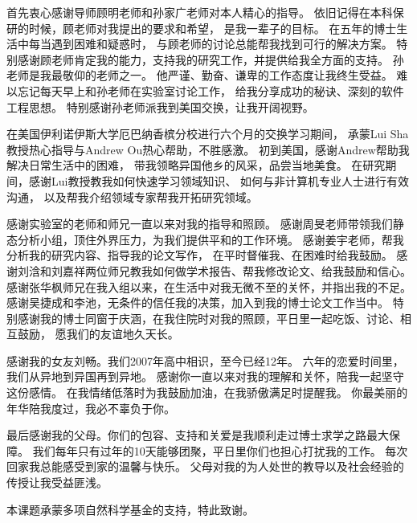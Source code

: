 \begin{acknowledgement}
  首先衷心感谢导师顾明老师和孙家广老师对本人精心的指导。
  依旧记得在本科保研的时候，顾老师对我提出的要求和希望，
  是我一辈子的目标。
  在五年的博士生活中每当遇到困难和疑惑时，
  与顾老师的讨论总能帮我找到可行的解决方案。
  特别感谢顾老师肯定我的能力，支持我的研究工作，并提供给我全方面的支持。
  孙老师是我最敬仰的老师之一。
  他严谨、勤奋、谦卑的工作态度让我终生受益。
  难以忘记每天早上和孙老师在实验室讨论工作，
  给我分享成功的秘诀、深刻的软件工程思想。
  特别感谢孙老师派我到美国交换，让我开阔视野。

  
  在美国伊利诺伊斯大学厄巴纳香槟分校进行六个月的交换学习期间，
  承蒙Lui Sha教授热心指导与Andrew Ou热心帮助，不胜感激。
  初到美国，感谢Andrew帮助我解决日常生活中的困难，
  带我领略异国他乡的风采，品尝当地美食。
  在研究期间，感谢Lui教授教我如何快速学习领域知识、
  如何与非计算机专业人士进行有效沟通，
  以及帮我介绍领域专家帮我开拓研究领域。
  

  感谢实验室的老师和师兄一直以来对我的指导和照顾。
  感谢周旻老师带领我们静态分析小组，顶住外界压力，为我们提供平和的工作环境。
  感谢姜宇老师，帮我分析我的研究内容、指导我的论文写作，
  在平时督催我、在困难时给我鼓励。
  感谢刘浛和刘嘉祥两位师兄教我如何做学术报告、帮我修改论文、给我鼓励和信心。
  感谢张华枫师兄在我入组以来，在生活中对我无微不至的关怀，并指出我的不足。  
  感谢吴捷成和李池，无条件的信任我的决策，加入到我的博士论文工作当中。
  特别感谢我的博士同窗于庆涵，在我住院时对我的照顾，平日里一起吃饭、讨论、相互鼓励，
  愿我们的友谊地久天长。
  
  
  感谢我的女友刘畅。我们2007年高中相识，至今已经12年。
  六年的恋爱时间里，我们从异地到异国再到异地。
  感谢你一直以来对我的理解和关怀，陪我一起坚守这份感情。
  在我情绪低落时为我鼓励加油，在我骄傲满足时提醒我。
  你最美丽的年华陪我度过，我必不辜负于你。
  
  最后感谢我的父母。你们的包容、支持和关爱是我顺利走过博士求学之路最大保障。
  我们每年只有过年的10天能够团聚，平日里你们也担心打扰我的工作。
  每次回家我总能感受到家的温馨与快乐。
  父母对我的为人处世的教导以及社会经验的传授让我受益匪浅。
  
  本课题承蒙多项自然科学基金的支持，特此致谢。
\end{acknowledgement}
